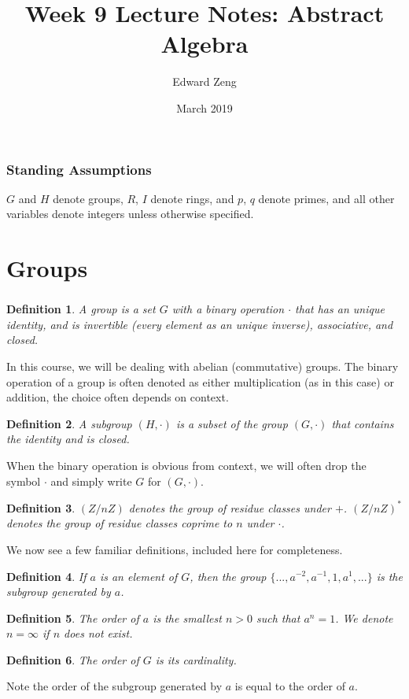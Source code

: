 \documentclass{article}
\title{Week 9 Lecture Notes: Abstract Algebra}
\author{Edward Zeng}
\date{March 2019}
\newtheorem{definition}{Definition}
\begin{document}
\maketitle

\subsubsection{Standing Assumptions}
$G$ and $H$ denote groups, $R$, $I$ denote rings, and $p$, $q$ denote primes, and all other variables denote integers unless otherwise specified.

\section{Groups}
\subsubsection{}
\begin{definition}
    A group is a set $G$ with a binary operation $\cdot$ that has an unique identity, and is invertible (every element as an unique inverse), associative, and closed.
\end{definition}
In this course, we will be dealing with abelian (commutative) groups. The binary operation of a group is often denoted as either multiplication (as in this case) or addition, the choice often depends on context.
\begin{definition}
    A subgroup $(H, \cdot)$ is a subset of the group $(G, \cdot)$ that contains the identity and is closed.
\end{definition}
When the binary operation is obvious from context, we will often drop the symbol $\cdot$ and simply write $G$ for $(G, \cdot)$.
\begin{definition}
    $(Z/nZ)$ denotes the group of residue classes under $+$. $(Z/nZ)^{*}$ denotes the group of residue classes coprime to $n$ under $\cdot$.
\end{definition}
We now see a few familiar definitions, included here for completeness.
\begin{definition}
    If $a$ is an element of $G$, then the group $\{ ..., a^{-2}, a^{-1}, 1, a^{1}, ... \}$ is the subgroup generated by $a$.
\end{definition}
\begin{definition}
    The order of $a$ is the smallest $n > 0$ such that $a^{n} = 1$. We denote $n = \infty$ if $n$ does not exist.
\end{definition}
\begin{definition}
    The order of $G$ is its cardinality.
\end{definition}
Note the order of the subgroup generated by $a$ is equal to the order of $a$.
\end{document}
